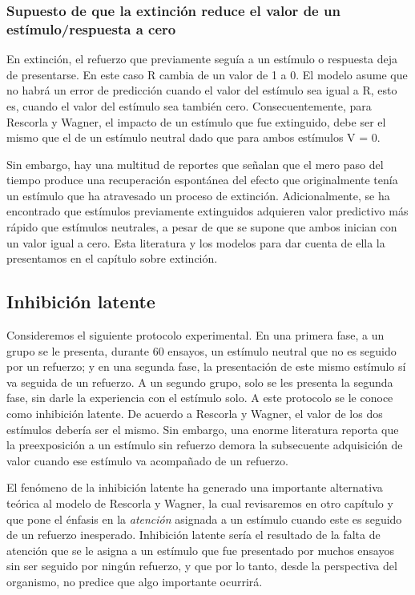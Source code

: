 \documentclass[
  letterpaper,
]{book}
\begin{document}
\subsubsection{Supuesto de que la extinción reduce el valor de un
estímulo/respuesta a
cero}\label{supuesto-de-que-la-extinciuxf3n-reduce-el-valor-de-un-estuxedmulorespuesta-a-cero}

En extinción, el refuerzo que previamente seguía a un estímulo o
respuesta deja de presentarse. En este caso R cambia de un valor de 1 a
0. El modelo asume que no habrá un error de predicción cuando el valor
del estímulo sea igual a R, esto es, cuando el valor del estímulo sea
también cero. Consecuentemente, para Rescorla y Wagner, el impacto de un
estímulo que fue extinguido, debe ser el mismo que el de un estímulo
neutral dado que para ambos estímulos V = 0.

Sin embargo, hay una multitud de reportes que señalan que el mero paso
del tiempo produce una recuperación espontánea del efecto que
originalmente tenía un estímulo que ha atravesado un proceso de
extinción. Adicionalmente, se ha encontrado que estímulos previamente
extinguidos adquieren valor predictivo más rápido que estímulos
neutrales, a pesar de que se supone que ambos inician con un valor igual
a cero. Esta literatura y los modelos para dar cuenta de ella la
presentamos en el capítulo sobre extinción.

\subsection{Inhibición latente}\label{inhibiciuxf3n-latente}

Consideremos el siguiente protocolo experimental. En una primera fase, a
un grupo se le presenta, durante 60 ensayos, un estímulo neutral que no
es seguido por un refuerzo; y en una segunda fase, la presentación de
este mismo estímulo sí va seguida de un refuerzo. A un segundo grupo,
solo se les presenta la segunda fase, sin darle la experiencia con el
estímulo solo. A este protocolo se le conoce como inhibición latente. De
acuerdo a Rescorla y Wagner, el valor de los dos estímulos debería ser
el mismo. Sin embargo, una enorme literatura reporta que la
preexposición a un estímulo sin refuerzo demora la subsecuente
adquisición de valor cuando ese estímulo va acompañado de un refuerzo.

El fenómeno de la inhibición latente ha generado una importante
alternativa teórica al modelo de Rescorla y Wagner, la cual revisaremos
en otro capítulo y que pone el énfasis en la \emph{atención} asignada a
un estímulo cuando este es seguido de un refuerzo inesperado. Inhibición
latente sería el resultado de la falta de atención que se le asigna a un
estímulo que fue presentado por muchos ensayos sin ser seguido por
ningún refuerzo, y que por lo tanto, desde la perspectiva del organismo,
no predice que algo importante ocurrirá.
\end{document}
